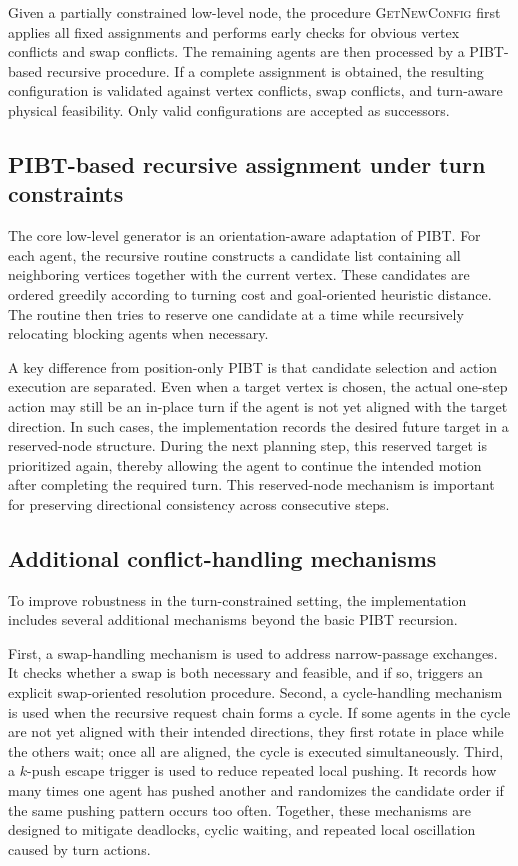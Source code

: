 \documentclass[lettersize,journal]{IEEEtran}
\begin{document}
Given a partially constrained low-level node, the procedure \textsc{GetNewConfig} first applies all fixed assignments and performs early checks for obvious vertex conflicts and swap conflicts. The remaining agents are then processed by a PIBT-based recursive procedure. If a complete assignment is obtained, the resulting configuration is validated against vertex conflicts, swap conflicts, and turn-aware physical feasibility. Only valid configurations are accepted as successors. 

\subsection{PIBT-based recursive assignment under turn constraints}
\label{subsec:impl_pibt}

The core low-level generator is an orientation-aware adaptation of PIBT. For each agent, the recursive routine constructs a candidate list containing all neighboring vertices together with the current vertex. These candidates are ordered greedily according to turning cost and goal-oriented heuristic distance. The routine then tries to reserve one candidate at a time while recursively relocating blocking agents when necessary. 

A key difference from position-only PIBT is that candidate selection and action execution are separated. Even when a target vertex is chosen, the actual one-step action may still be an in-place turn if the agent is not yet aligned with the target direction. In such cases, the implementation records the desired future target in a reserved-node structure. During the next planning step, this reserved target is prioritized again, thereby allowing the agent to continue the intended motion after completing the required turn. This reserved-node mechanism is important for preserving directional consistency across consecutive steps. 

\subsection{Additional conflict-handling mechanisms}
\label{subsec:impl_conflict_handling}

To improve robustness in the turn-constrained setting, the implementation includes several additional mechanisms beyond the basic PIBT recursion.

First, a swap-handling mechanism is used to address narrow-passage exchanges. It checks whether a swap is both necessary and feasible, and if so, triggers an explicit swap-oriented resolution procedure. Second, a cycle-handling mechanism is used when the recursive request chain forms a cycle. If some agents in the cycle are not yet aligned with their intended directions, they first rotate in place while the others wait; once all are aligned, the cycle is executed simultaneously. Third, a $k$-push escape trigger is used to reduce repeated local pushing. It records how many times one agent has pushed another and randomizes the candidate order if the same pushing pattern occurs too often. Together, these mechanisms are designed to mitigate deadlocks, cyclic waiting, and repeated local oscillation caused by turn actions.
\end{document}
